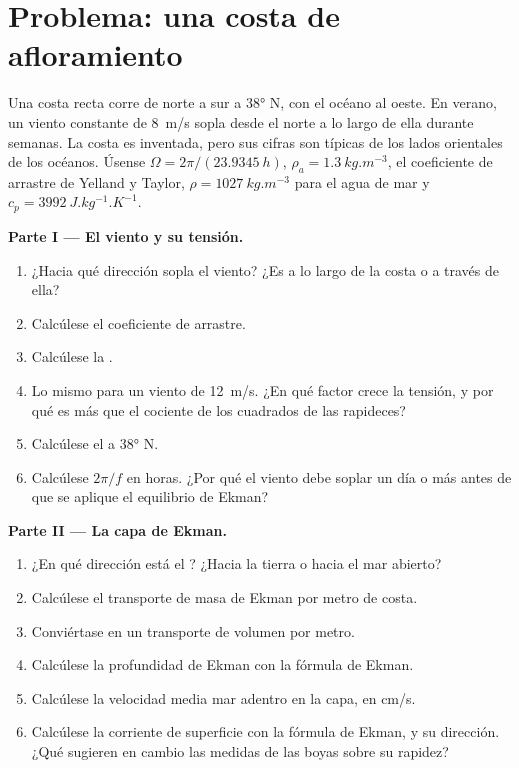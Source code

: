 \section{Problema: una costa de afloramiento}

\begin{problem}
\label{pb:b1:ocean-circulation:1}
Una costa recta corre de norte a sur a \ang{38} N, con el océano al oeste. En verano, un viento constante de \qty{8}{m/s} sopla desde el norte a lo largo de ella durante semanas. La costa es inventada, pero sus cifras son típicas de los lados orientales de los océanos. Úsense $\Omega = 2\pi/(\qty{23.9345}{h})$, $\rho_a = \qty{1.3}{kg.m^{-3}}$, el coeficiente de arrastre de Yelland y Taylor, $\rho = \qty{1027}{kg.m^{-3}}$ para el agua de mar y $c_p = \qty{3992}{J.kg^{-1}.K^{-1}}$.

\medskip
\noindent\textbf{Parte I --- El viento y su tensión.}
\begin{enumerate}
  \item ¿Hacia qué dirección sopla el viento? ¿Es a lo largo de la costa o a través de ella?
  \item Calcúlese el coeficiente de arrastre.
  \item Calcúlese la .
  \item Lo mismo para un viento de \qty{12}{m/s}. ¿En qué factor crece la tensión, y por qué es más que el cociente de los cuadrados de las rapideces?
  \item Calcúlese el  a \ang{38} N.
  \item Calcúlese $2\pi/f$ en horas. ¿Por qué el viento debe soplar un día o más antes de que se aplique el equilibrio de Ekman?
\end{enumerate}

\medskip
\noindent\textbf{Parte II --- La capa de Ekman.}
\begin{enumerate}[resume]
  \item ¿En qué dirección está el ? ¿Hacia la tierra o hacia el mar abierto?
  \item Calcúlese el transporte de masa de Ekman por metro de costa.
  \item Conviértase en un transporte de volumen por metro.
  \item Calcúlese la profundidad de Ekman con la fórmula de Ekman.
  \item Calcúlese la velocidad media mar adentro en la capa, en \unit{cm/s}.
  \item Calcúlese la corriente de superficie con la fórmula de Ekman, y su dirección. ¿Qué sugieren en cambio las medidas de las boyas sobre su rapidez?
\end{enumerate}


\end{problem}
